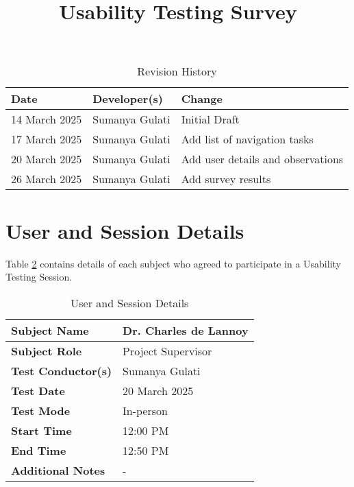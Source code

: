 \documentclass{article}
\title{Usability Testing Survey\\\progname}
\author{\authname}
\date{}
\begin{document}
\maketitle

\begin{table}[hp]
\caption{Revision History} \label{TblRevisionHistory}
\begin{tabularx}{\textwidth}{llX}
\toprule
\textbf{Date} & \textbf{Developer(s)} & \textbf{Change}\\
\midrule
14 March 2025 & Sumanya Gulati & Initial Draft\\
17 March 2025 & Sumanya Gulati & Add list of navigation tasks\\
20 March 2025 & Sumanya Gulati & Add user details and observations\\
26 March 2025 & Sumanya Gulati & Add survey results\\
\bottomrule
\end{tabularx}
\end{table}

\newpage

\section{User and Session Details}
Table \ref{UserDetails} contains details of each subject who agreed to participate in a 
Usability Testing Session.
\begin{table}[hp]
\begin{tabularx}{\textwidth}{l | X}
\toprule
\textbf{Subject Name} & Dr. Charles de Lannoy \\
\midrule
\textbf{Subject Role} & Project Supervisor \\
\midrule
\textbf{Test Conductor(s)} & Sumanya Gulati \\
\midrule
\textbf{Test Date} & 20 March 2025 \\
\midrule
\textbf{Test Mode} & In-person \\
\midrule
\textbf{Start Time} & 12:00 PM \\
\midrule
\textbf{End Time} & 12:50 PM \\
\midrule
\textbf{Additional Notes} & - \\
\bottomrule
\end{tabularx}
\caption{User and Session Details} \label{UserDetails}
\end{table}
\end{document}
